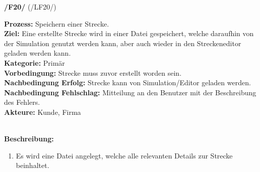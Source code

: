 \documentclass[11pt,a4paper]{article}
\begin{document}
	\noindent\large\textbf{/F20/} (/LF20/)
	\normalsize\\
	\begin{addmargin}{0.1 \textwidth}
		\textbf{Prozess:} Speichern einer Strecke.\\
		\textbf{Ziel:} Eine erstellte Strecke wird in einer Datei gespeichert, welche daraufhin von der Simulation genutzt werden kann, aber auch wieder in den Streckeneditor geladen werden kann.\\
		\textbf{Kategorie:} Primär\\
		\textbf{Vorbedingung:} Strecke muss zuvor erstellt worden sein.\\
		\textbf{Nachbedingung Erfolg:} Strecke kann von Simulation/Editor geladen werden.\\
		\textbf{Nachbedingung Fehlschlag:} Mitteilung an den Benutzer mit der Beschreibung des Fehlers.\\
		\textbf{Akteure:} Kunde, Firma\\
		\\
		\begin{minipage}{\textwidth}
			\textbf{Beschreibung:}
			\begin{enumerate}
				\item Es wird eine Datei angelegt, welche alle relevanten Details zur Strecke beinhaltet.\\
			\end{enumerate}
		\end{minipage}
	\end{addmargin}
	
\end{document}
